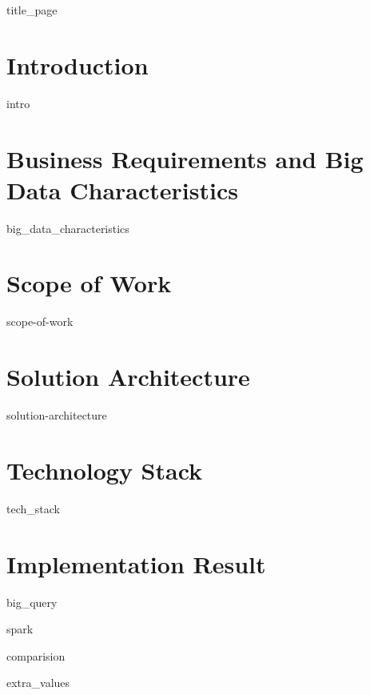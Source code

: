 \documentclass[a4paper, 12pt]{article}
\begin{document}
{title_page}

\newpage
\tableofcontents
\newpage

\section{Introduction}
{intro}
\newpage

\section{Business Requirements and Big Data Characteristics}
{big_data_characteristics}
\newpage

\section{Scope of Work}
{scope-of-work}
\newpage

\section{Solution Architecture}
{solution-architecture}
\newpage

\section{Technology Stack}
{tech_stack}
\newpage

\section{Implementation Result}

{big_query}

{spark}

{comparision}

{extra_values}
\newpage

\printbibliography

\printindex
\end{document}
